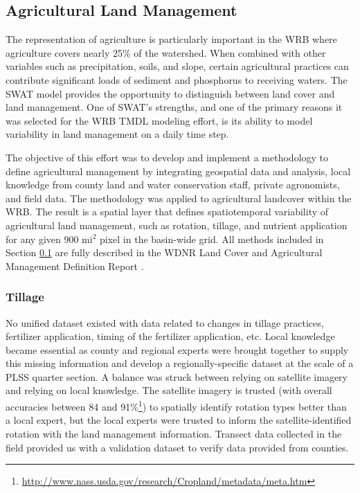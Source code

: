\subsection{Agricultural Land Management}\label{sec:ag_land_mgt}
The representation of agriculture is particularly important in the WRB where agriculture covers nearly
25\% of the watershed. When combined with other variables such as precipitation, soils,
and slope, certain agricultural practices can contribute significant loads of sediment and phosphorus to receiving waters.  
The SWAT model provides the opportunity to distinguish between land cover and land management. 
One of SWAT’s strengths, and one of the primary reasons it was selected for the WRB TMDL modeling effort, is its ability to model variability in land management on a daily time step.

The objective of this effort was to develop and implement a methodology to define agricultural management by integrating geospatial data and analysis, local knowledge from county land and water conservation staff, private agronomists, and field data. The methodology was applied to agricultural landcover within the WRB. The result is a spatial layer that defines spatiotemporal variability of agricultural land management, such as rotation, tillage, and nutrient application for any given 900 mi$^2$ pixel in the basin-wide grid. All methods included in Section \ref{sec:ag_land_mgt} are fully described in the WDNR Land Cover and Agricultural Management Definition Report .

\subsubsection{Tillage}

No unified dataset existed with data related to changes in tillage practices, fertilizer application, timing of the fertilizer application, etc.  Local knowledge became essential as county and regional experts were brought together to supply this missing information and develop a regionally-specific dataset at the scale of a PLSS quarter section. A balance was struck between relying on satellite imagery and relying on local knowledge. The satellite imagery is trusted (with overall accuracies between  84 and 91\%\footnote{\url{http://www.nass.usda.gov/research/Cropland/metadata/meta.htm}}) to spatially identify rotation types better than a local expert, but the local experts were trusted to inform the satellite-identified rotation with the land management information. Transect data collected in the field provided us with a validation dataset to verify data provided from counties.


